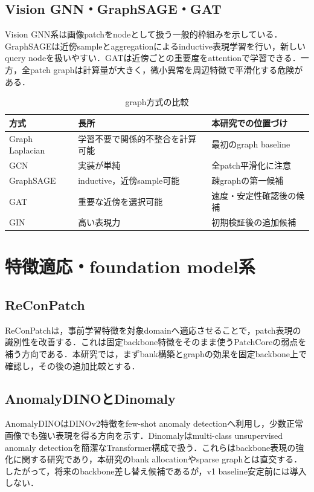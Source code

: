\documentclass[a4paper,11pt]{ltjsarticle}
\begin{document}
\subsection{Vision GNN・GraphSAGE・GAT}
Vision GNN系は画像patchをnodeとして扱う一般的枠組みを示している．GraphSAGEは近傍sampleとaggregationによるinductive表現学習を行い，新しいquery nodeを扱いやすい．GATは近傍ごとの重要度をattentionで学習できる．一方，全patch graphは計算量が大きく，微小異常を周辺特徴で平滑化する危険がある．

\begin{table}[H]
\centering
\caption{graph方式の比較}
\begin{tabularx}{\linewidth}{L{32mm}L{40mm}Y}
\toprule
方式 & 長所 & 本研究での位置づけ \\
\midrule
Graph Laplacian & 学習不要で関係的不整合を計算可能 & 最初のgraph baseline \\
GCN & 実装が単純 & 全patch平滑化に注意 \\
GraphSAGE & inductive，近傍sample可能 & 疎graphの第一候補 \\
GAT & 重要な近傍を選択可能 & 速度・安定性確認後の候補 \\
GIN & 高い表現力 & 初期検証後の追加候補 \\
\bottomrule
\end{tabularx}
\end{table}

\section{特徴適応・foundation model系}
\subsection{ReConPatch}
ReConPatchは，事前学習特徴を対象domainへ適応させることで，patch表現の識別性を改善する．これは固定backbone特徴をそのまま使うPatchCoreの弱点を補う方向である．本研究では，まずbank構築とgraphの効果を固定backbone上で確認し，その後の追加比較とする．

\subsection{AnomalyDINOとDinomaly}
AnomalyDINOはDINOv2特徴をfew-shot anomaly detectionへ利用し，少数正常画像でも強い表現を得る方向を示す．Dinomalyはmulti-class unsupervised anomaly detectionを簡潔なTransformer構成で扱う．これらはbackbone表現の強化に関する研究であり，本研究のbank allocationやsparse graphとは直交する．したがって，将来のbackbone差し替え候補であるが，v1 baseline安定前には導入しない．
\end{document}

